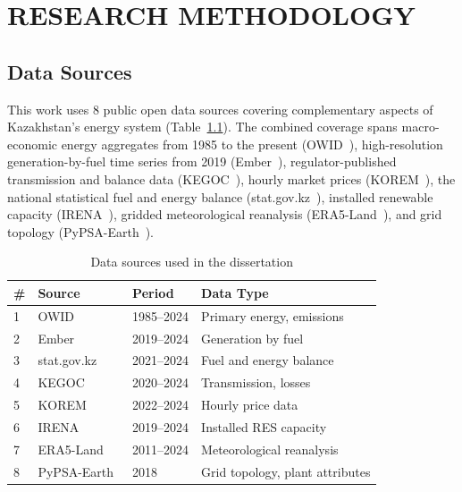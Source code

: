 
\chapter{RESEARCH METHODOLOGY}
\label{ch:methodology}

\section{Data Sources}
\label{sec:data_sources}

This work uses 8 public open data sources covering complementary aspects of Kazakhstan's energy system (Table~\ref{tab:data_sources}). The combined coverage spans macro-economic energy aggregates from 1985 to the present (OWID~\cite{owid2024}), high-resolution generation-by-fuel time series from 2019 (Ember~\cite{ember2024}), regulator-published transmission and balance data (KEGOC~\cite{kegoc2024}), hourly market prices (KOREM~\cite{korem2024}), the national statistical fuel and energy balance (stat.gov.kz~\cite{statgov2024}), installed renewable capacity (IRENA~\cite{irena2024}), gridded meteorological reanalysis (ERA5-Land~\cite{munoz2021}), and grid topology (PyPSA-Earth~\cite{parzen2023}).

\begin{table}[h!]
\centering
\caption{Data sources used in the dissertation}
\label{tab:data_sources}
\begin{tabular}{@{}llll@{}}
\toprule
\# & Source & Period & Data Type \\
\midrule
1 & OWID~\cite{owid2024} & 1985--2024 & Primary energy, emissions \\
2 & Ember~\cite{ember2024} & 2019--2024 & Generation by fuel \\
3 & stat.gov.kz~\cite{statgov2024} & 2021--2024 & Fuel and energy balance \\
4 & KEGOC~\cite{kegoc2024} & 2020--2024 & Transmission, losses \\
5 & KOREM~\cite{korem2024} & 2022--2024 & Hourly price data \\
6 & IRENA~\cite{irena2024} & 2019--2024 & Installed RES capacity \\
7 & ERA5-Land~\cite{munoz2021} & 2011--2024 & Meteorological reanalysis \\
8 & PyPSA-Earth~\cite{parzen2023} & 2018 & Grid topology, plant attributes \\
\bottomrule
\end{tabular}
\end{table}

